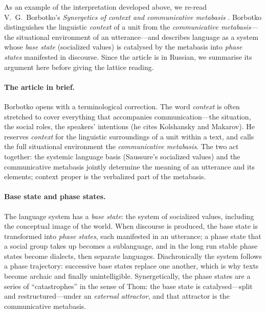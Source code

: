\documentclass[11pt,a4paper]{article}
\theoremstyle{remark}
\begin{document}
As an example of the interpretation developed above, we re-read
V.~G.~Borbotko's \emph{Synergetics of context and communicative metabasis}
\cite{borbotko2007}. Borbotko distinguishes the linguistic \emph{context} of a
unit from the \emph{communicative metabasis}---the situational environment of
an utterance---and describes language as a system whose \emph{base state}
(socialized values) is catalysed by the metabasis into \emph{phase states}
manifested in discourse. Since the article is in Russian, we summarise its
argument here before giving the lattice reading.

\paragraph{The article in brief.}
Borbotko opens with a terminological correction. The word \emph{context} is
often stretched to cover everything that accompanies communication---the
situation, the social roles, the speakers' intentions (he cites Kolshansky and
Makarov). He reserves \emph{context} for the linguistic surroundings of a unit
within a text, and calls the full situational environment the
\emph{communicative metabasis}. The two act together: the systemic language
basis (Saussure's socialized values) and the communicative metabasis jointly
determine the meaning of an utterance and its elements; context proper is the
verbalized part of the metabasis.

\paragraph{Base state and phase states.}
The language system has a \emph{base state}: the system of socialized values,
including the conceptual image of the world. When discourse is produced, the
base state is transformed into \emph{phase states}, each manifested in an
utterance; a phase state that a social group takes up becomes a sublanguage,
and in the long run stable phase states become dialects, then separate
languages. Diachronically the system follows a phase trajectory: successive
base states replace one another, which is why texts become archaic and finally
unintelligible. Synergetically, the phase states are a series of
``catastrophes'' in the sense of Thom: the base state is catalysed---split and
restructured---under an \emph{external attractor}, and that attractor is the
communicative metabasis.
\end{document}

